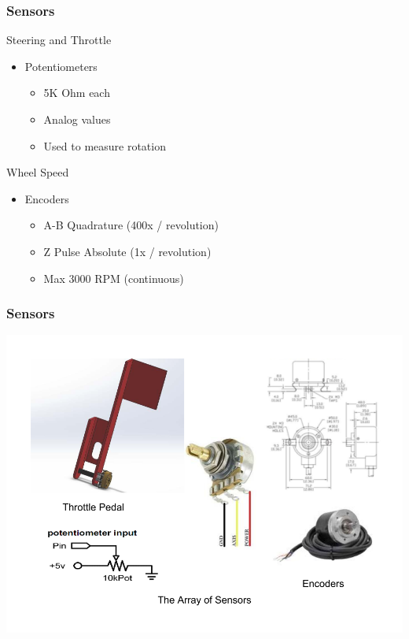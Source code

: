 \documentclass{beamer}
\begin{document}
\begin{frame}
	\frametitle{Sensors}
		\begin{block}{Steering and Throttle}
			\begin{itemize}
				\item Potentiometers
					\begin{itemize}
						\item 5K Ohm each
						\item Analog values
						\item Used to measure rotation
					\end{itemize}
			\end{itemize}
		\end{block}
		\begin{block}{Wheel Speed}
			\begin{itemize}
				\item Encoders
					\begin{itemize}
						\item A-B Quadrature (400x / revolution)
						\item Z Pulse Absolute (1x / revolution)
						\item Max 3000 RPM (continuous) 
					\end{itemize}
			\end{itemize}
		\end{block}	
\end{frame}
\begin{frame}
	\frametitle{Sensors}
	\centering
	\includegraphics[scale=.3]{figures/png/SeniorDesignPresentation.png}
\end{frame}
\end{document}
